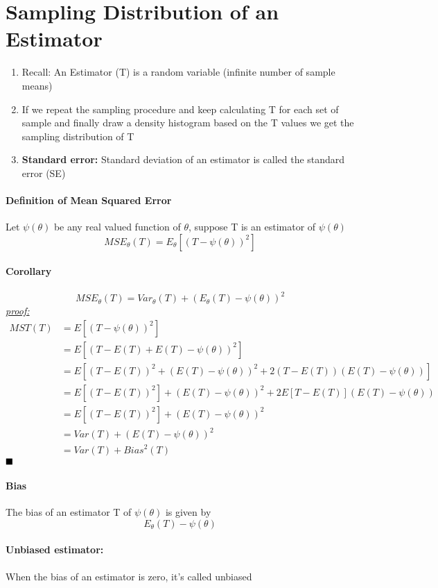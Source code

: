 \documentclass[11pt]{article}
\newcommand{\tb}[1]{\textbf{#1}}
\newcommand{\proof}[0]{\textit{\underline{proof: }}}
\newcommand{\qed}[0]{$\hfill\blacksquare$}
\begin{document}
\section{Sampling Distribution of an Estimator}
\begin{enumerate}
	\item Recall: An Estimator (T) is a random variable (infinite number of sample means)
	\item If we repeat the sampling procedure and keep calculating T for each set of sample and finally draw a density histogram based on the T values we get the sampling distribution of T
	\item \tb{Standard error:} Standard deviation of an estimator is called the standard error (SE)
\end{enumerate}

\paragraph{Definition of Mean Squared Error}
Let $\psi(\theta)$ be any real valued function of $\theta$, suppose T is an estimator of $\psi(\theta)$
$$MSE_\theta(T) = E_\theta[(T - \psi(\theta))^2]$$
\paragraph{Corollary}
$$MSE_\theta(T) = Var_\theta(T) + (E_\theta(T) - \psi(\theta))^2$$
\proof
\begin{align*}
	MST(T) &= E[(T - \psi({\theta}))^2] \\
	&= E[(T - E(T) + E(T) - \psi({\theta}))^2] \\
	&= E[(T - E(T))^2 + (E(T) - \psi({\theta}))^2 + 2(T-E(T))(E(T)-\psi({\theta}))] \\
	&= E[(T - E(T))^2] + (E(T) - \psi({\theta}))^2 +  2E[T-E(T)](E(T)-\psi({\theta}))\\
	&= E[(T - E(T))^2] + (E(T) - \psi({\theta}))^2 \tag{Since $E[T-E(T)] =  E(T)-E(T) = 0$}\\
	&= Var(T) + (E(T) - \psi({\theta}))^2\\
	&= Var(T) + Bias^2(T)
\end{align*}\qed

\paragraph{Bias} The bias of an estimator T of $\psi(\theta)$ is given by $$E_\theta(T) - \psi(\theta)$$
\paragraph{Unbiased estimator:} When the bias of an estimator is zero, it's called unbiased
\end{document}
